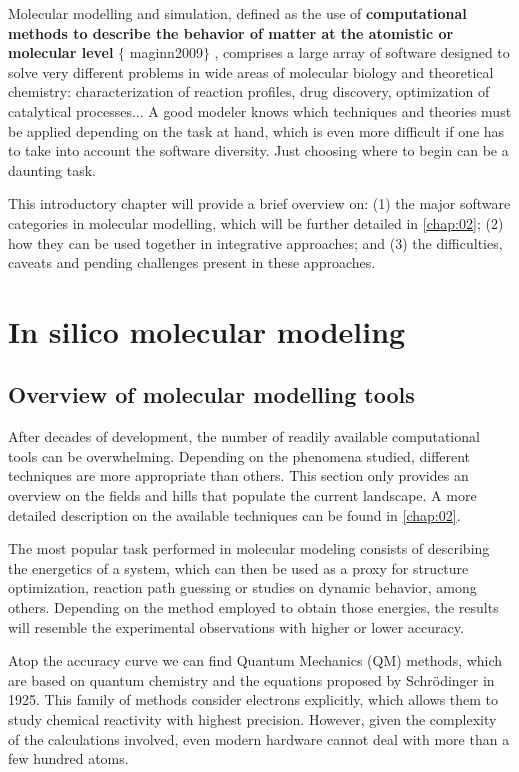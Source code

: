 Molecular modelling and simulation, defined as the use of \textbf{computational methods to describe the behavior of matter at the atomistic or molecular level} $ \{ $ maginn2009$ \} $ , comprises a large array of software designed to solve very different problems in wide areas of molecular biology and theoretical chemistry: characterization of reaction profiles, drug discovery, optimization of catalytical processes$ \ldots $  A good modeler knows which techniques and theories must be applied depending on the task at hand, which is even more difficult if one has to take into account the software diversity. Just choosing where to begin can be a daunting task.

This introductory chapter will provide a brief overview on: (1) the major software categories in molecular modelling, which will be further detailed in \autoref{chap:02}; (2) how they can be used together in integrative approaches; and (3) the difficulties, caveats and pending challenges present in these approaches.

\section{In silico molecular modeling}
\subsection{Overview of molecular modelling tools}

After decades of development, the number of readily available computational tools can be overwhelming. Depending on the phenomena studied, different techniques are more appropriate than others. This section only provides an overview on the fields and hills that populate the current landscape. A more detailed description on the available techniques can be found in \autoref{chap:02}.

The most popular task performed in molecular modeling consists of describing the energetics of a system, which can then be used as a proxy for structure optimization, reaction path guessing or studies on dynamic behavior, among others. Depending on the method employed to obtain those energies, the results will resemble the experimental observations with higher or lower accuracy.

Atop the accuracy curve we can find Quantum Mechanics (QM) methods, which are based on quantum chemistry and the equations proposed by Schrödinger in 1925. This family of methods consider electrons explicitly, which allows them to study chemical reactivity with highest precision. However, given the complexity of the calculations involved, even modern hardware cannot deal with more than a few hundred atoms.

